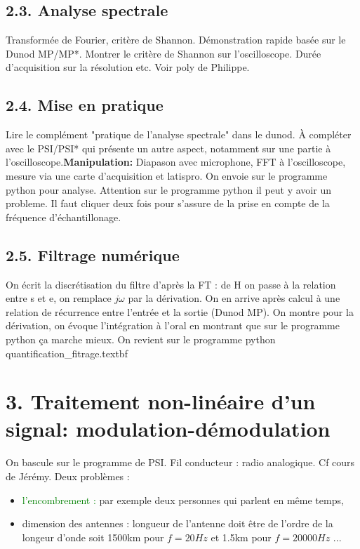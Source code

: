 \documentclass[french, a4paper, 10pt, twocolumn, landscape]{article}
\begin{document}
\subsection*{2.3. Analyse spectrale}

Transformée de Fourier, critère de Shannon. Démonstration rapide basée sur le Dunod MP/MP*. Montrer le critère de Shannon sur l'oscilloscope. Durée d'acquisition sur la résolution etc. Voir poly de Philippe.

\subsection*{2.4. Mise en pratique}

Lire le complément "pratique de l'analyse spectrale" dans le dunod. À compléter avec le PSI/PSI* qui présente un autre aspect, notamment sur une partie à l'oscilloscope.\textbf{Manipulation:} Diapason avec microphone, FFT à l'oscilloscope, mesure via une carte d'acquisition et latispro. On envoie sur le programme python pour analyse. Attention sur le programme python il peut y avoir un probleme. Il faut cliquer deux fois pour s'assure de la prise en compte de la fréquence d'échantillonage.

\subsection*{2.5. Filtrage numérique}

On écrit la discrétisation du filtre d'après la FT : de H on passe à la relation entre s et e, on remplace $j\omega$ par la dérivation. On en arrive après calcul à une relation de récurrence entre l'entrée et la sortie (Dunod MP). On montre pour la dérivation, on évoque l'intégration à l'oral en montrant que sur le programme python ça marche mieux. On revient sur le programme python quantification_fitrage.textbf

\section*{3. Traitement non-linéaire d'un signal: modulation-démodulation}

On bascule sur le programme de PSI. 
Fil conducteur : radio analogique. Cf cours de Jérémy.
Deux problèmes : 
\begin{itemize}
    \item \textcolor{green}{l'encombrement :} par exemple deux personnes qui parlent en même temps,
    \item dimension des antennes : longueur de l'antenne doit être de l'ordre de la longeur d'onde soit 1500km pour $f=20Hz$ et 1.5km pour $f=20000Hz$ ...
\end{itemize}
\end{document}
